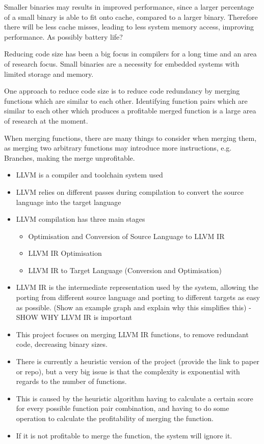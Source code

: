 Smaller binaries may results in improved performance, since a larger percentage of a small binary is able to fit onto cache, compared to a larger binary. Therefore there will be less cache misses, leading to less system memory access, improving performance. As possibly battery life?

Reducing code size has been a big focus in compilers for a long time and an area of research focus. Small binaries are a necessity for embedded systems with limited storage and memory. 

One approach to reduce code size is to reduce code redundancy by merging functions which are similar to each other. Identifying function pairs which are similar to each other which produces a profitable merged function is a large area of research at the moment.

When merging functions, there are many things to consider when merging them, as merging two arbitrary functions may introduce more instructions, e.g. Branches, making the merge unprofitable.


\begin{itemize}
    \item LLVM is a compiler and toolchain system used
    \item LLVM relies on different passes during compilation to convert the source language into the target language
    \item LLVM compilation has three main stages
    \begin{itemize}
        \item Optimisation and Conversion of Source Language to LLVM IR
        \item LLVM IR Optimisation
        \item LLVM IR to Target Language (Conversion and Optimisation)
    \end{itemize}
    \item LLVM IR is the intermediate representation used by the system, allowing the porting from different source language and porting to different targets as easy as possible. (Show an example graph and explain why this simplifies this) - SHOW WHY LLVM IR is important
    \item This project focuses on merging LLVM IR functions, to remove redundant code, decreasing binary sizes.
    \item There is currently a heuristic version of the project (provide the link to paper or repo), but a very big issue is that the complexity is exponential with regards to the number of functions.
    \item This is caused by the heuristic algorithm having to calculate a certain score for every possible function pair combination, and having to do some operation to calculate the profitability of merging the function.
    \item If it is not profitable to merge the function, the system will ignore it.
\end{itemize}



